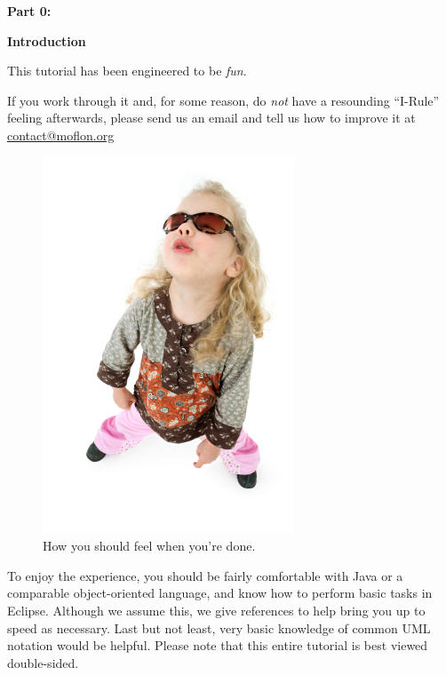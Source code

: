 
{\bf \huge Part 0:}

\vspace{1cm}

{\bf \Huge Introduction }

\vspace{2cm}


This tutorial has been engineered to be \emph{fun}.

If you work through it and, for some reason, do \emph{not} have a resounding \mbox{``I-Rule''} feeling afterwards, please send us an email and tell us how to improve it at \href{mailto:contact@moflon.org}{contact@moflon.org}

\begin{figure}[htp]
\begin{center}
	\includegraphics[height=0.45\textheight]{../introduction_images/i-rule}
	\caption{How you should feel when you're done.}
	\label{i-rule}
\end{center}
\end{figure}
\break
 

To enjoy the experience, you should be fairly comfortable with Java or a comparable object-oriented language, and know how to perform basic tasks in Eclipse.  Although we assume this, we give references to help bring you up to speed as necessary. Last but not least, very basic knowledge of common UML notation would be helpful. Please note that this entire tutorial is best viewed double-sided.

